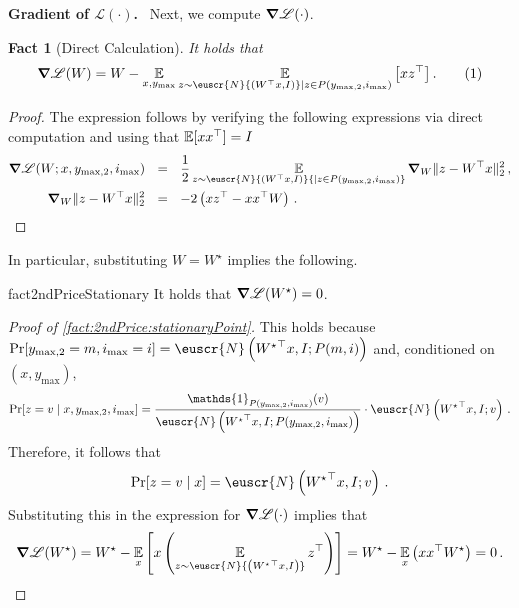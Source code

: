 \documentclass[11pt,letterpaper]{article}
\theoremstyle{plain}
\newtheorem{fact}[theorem]{Fact}
\theoremstyle{definition}
\theoremstyle{remark}
\newcommand{\yesnum}{\addtocounter{equation}{1}\tag{\theequation}}
\newcommand{\inparen}[1]{\ensuremath{\left(#1\right)}}
\newcommand{\insquare}[1]{\ensuremath{\left[#1\right]}}
\newcommand{\snorm}[1]{\ensuremath{\ensuremath{\| #1 \|}}}
\newcommand{\E}{\operatornamewithlimits{\mathbb{E}}}
\newcommand{\Ex}{\E}
\newcommand{\customcal}[1]{\euscr{#1}}
\newcommand{\cL}{\customcal{L}}
\newcommand{\cN}{\customcal{N}}
\renewcommand{\paragraph}[1]{\medskip \noindent\textbf{#1}~}
\newcommand{\negLL}{\ensuremath{\mathscr{L}}}
\newcommand{\normal}[2]{\cN{\inparen{#1,#2}}}
\newcommand{\normalMass}[3]{\cN\inparen{#1, #2; #3}}
\newcommand{\Wstar}{{W^\star}}
\newcommand{\ymax}{y_{\max}}
\renewcommand{\cL}{\negLL}
\newcommand{\smax}{\max,2} %
\newcommand{\imax}{i_{\max}}
\newcommand{\ysmax}{y_{\smax}}
\begin{document}
{{{        \paragraph{Gradient of $\cL(\cdot)$.}
        Next, we compute $\grad\cL(\cdot)$. %
        \begin{fact}[Direct Calculation]
            It holds that 
            \[
                \grad \cL(W)
                = W - \Ex_{x, \ymax}
                    {
                        \Ex_{z\sim \normal{W^\top x}{I} \mid z\in P(\ysmax,\imax)}\insquare{xz^\top }
                    }
                    \,.
                \yesnum\label{eq:2ndPrice:gradientExpression}
            \]
        \end{fact}
        \begin{proof}
            The expression follows by verifying the following expressions via direct computation and using that $\Ex[xx^\top]=I$
            \begin{align*}
                \grad \cL(W; x,\ysmax,\imax)
                    &~~=~~ \frac{1}{2}\Ex_{z\sim \normal{W^\top x}{I} {\mid z\in P(\ysmax,\imax)}}{
                        \grad_W \snorm{z-W^\top x}_2^2
                    }\,,\\
                \grad_W \snorm{z-W^\top x}_2^2 
                    &~~=~~ -2\inparen{xz^\top -xx^\top W}\,.
            \end{align*}
        \end{proof}
        In particular, substituting $W=\Wstar$ implies the following.
        \begin{restatable}[]{fact}{2ndPriceStationary}\label{fact:2ndPrice:stationaryPoint}
            It holds that $\grad \cL(W^\star)=0$.    
        \end{restatable}
        \begin{proof}[Proof of \cref{fact:2ndPrice:stationaryPoint}]
            This holds because $\Pr[\ysmax = m, \imax=i] = \normalMass{{W^\star}^\top x}{I}{{P(m,i)}}$ and, conditioned on $(x,\ymax)$, 
            \[
                \Pr[z=v\mid x,\ysmax,\imax]= \frac{\mathds{1}_{P({\ysmax,\imax})}(v)}{\normalMass{{W^\star}^\top x}{I}{P({\ysmax,\imax})}}\cdot \normalMass{{W^\star}^\top x}{I}{v}\,.  
            \]
            Therefore, it follows that 
            \[
                \Pr[z=v\mid x] = \normalMass{{W^\star}^\top x}{I}{v}\,.  
            \]
            Substituting this in the expression for $\grad\cL(\cdot)$ implies that
            \[
                \grad \cL(W^\star) 
                = W^\star - \Ex_x \insquare{x \inparen{\Ex_{z\sim \normal{\Wstar^\top x}{I}} z^\top}}
                = \Wstar - \Ex_{x}\inparen{ xx^\top W^\star} = 0\,.
            \]
        \end{proof}
        
}}}
\end{document}

